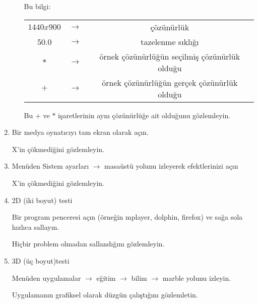 \documentclass[a4paper,10pt]{article}
\begin{document}
\begin{enumerate}
\begin{enumerate}
	  Bu bilgi:
	  \begin{table}[h]
	  \centering
	  \begin{tabular}{|c|c|c|}
		  \hline
		  $1440x900$ & $\rightarrow$ & çözünürlük \\
		  50.0       & $\rightarrow$ & tazelenme sıklığı \\
		  $*$        & $\rightarrow$ & örnek çözünürlüğün seçilmiş çözünürlük olduğu \\
		  $+$        & $\rightarrow$ & örnek çözünürlüğün gerçek çözünürlük olduğu\\
		  \hline
	  \end{tabular} 
	  \label{tab:tbl}
	  \end{table}

	  Bu $+$ ve $*$ işaretlerinin aynı çözünürlüğe ait olduğunu gözlemleyin. 
    \end{enumerate}
 \item  Bir medya oynatıcıyı tam ekran olarak açın. 

      X'in çökmediğini gözlemleyin.
 \item Menüden Sistem ayarları $\rightarrow$ masaüstü yolunu izleyerek efektlerinizi açın
 
  X'in çökmediğini gözlemleyin.
  \item 2D (iki boyut) testi 
      
      Bir program penceresi açın (örneğin mplayer, dolphin, firefox) ve sağa sola hızlıca sallayın.
        
      Hiçbir problem olmadan sallandığını gözlemleyin.

 \item 3D (üç boyut)testi

    Menüden uygulamalar $\rightarrow$ eğitim $\rightarrow$ bilim $\rightarrow$ marble yolunu izleyin.
	
    Uygulamanın grafiksel olarak düzgün çalıştığını gözlemletin.
    \end{enumerate}
\end{document}
